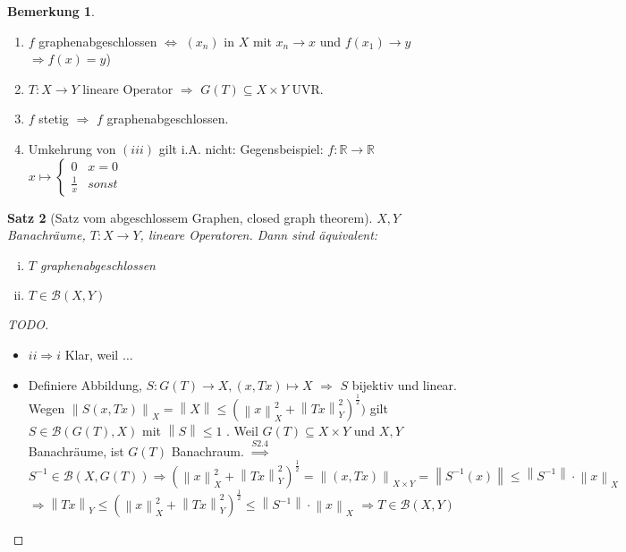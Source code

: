 \documentclass[ngerman]{report}
\theoremstyle{plain}%
\newtheorem{thm}{Satz}[chapter]
\theoremstyle{definition}%
\theoremstyle{myStyle}
\newtheorem{bem}[thm]{Bemerkung}
\newcommand{\R}{\mathbb{R}}
\newcommand{\B}{\mathcal{B}} %
\newcommand{\BS}[1][X,Y]{\mathcal{B}(#1)} %
\newcommand{\norm}[1]{\left \|#1\right\| }
\newcommand{\df}[1][]{%
	\overset{#1}{\Rightarrow}
}
\newcommand{\aq}{\Leftrightarrow} %
\newcommand{\inv}[1]{#1^{-1}}
\newcommand{\qmarks}[1]{#1}
\begin{document}
	\begin{bem}
		\begin{enumerate}
			\item $f$ graphenabgeschlossen $\aq$ $(x_n)$ in $X$ mit $x_n \to x$ und $f(x_1) \to y$ 
			$\df f(x) = y$)
			\item $T: X\to Y$ lineare Operator $\df$ $G(T) \subseteq X\times Y$ UVR.
			\item $f$ stetig $\df$ $f$ graphenabgeschlossen.
			\item Umkehrung von $(iii)$ gilt i.A. nicht: Gegensbeispiel: $f: \R \to \R$ 
				$x\mapsto \begin{cases} 0& x=0\\ \frac{1}{x} & sonst \end{cases}$
		\end{enumerate}
	\end{bem}

	\begin{thm}[Satz vom abgeschlossem Graphen, closed graph theorem]
		$X,Y$ Banachräume, $T: X\to Y$, lineare Operatoren. Dann sind äquivalent:
			\begin{enumerate}[(i)]
				\item $T$ graphenabgeschlossen
				\item $T\in \BS$
			\end{enumerate}
	\end{thm}

	\begin{proof}[TODO]
		\begin{itemize}
			\item \qmarks{$ii\df i$} Klar, weil $\dots$ 
			\item Definiere Abbildung, $S: G(T) \to X, (x,Tx) \mapsto X$
			$\df$ $S$ bijektiv und linear. Wegen 
				$\norm{S(x,Tx)}_X = \norm{X} \leq (\norm{x}_X^2 + \norm{Tx}_Y^2)^{\frac{1}{2}})$
				gilt $S\in \B(G(T),X)$ mit $\norm{S} \leq 1$ .
				Weil $G(T) \subseteq X\times Y$ und $X,Y$ Banachräume, ist $G(T)$ Banachraum.
				$\df[S2.4]$ $\inv{S} \in \B(X, G(T)) \df (\norm{x}_X^2 + \norm{Tx}_Y^2)^{\frac{1}{2}} = \norm{(x,Tx)}_{X\times Y} = \norm{\inv{S}(x)} \leq \norm{\inv{S}} \cdot \norm{x}_X$
				$\df \norm{Tx}_Y \leq (\norm{x}_X^2 + \norm{Tx}_Y^2)^{\frac{1}{2}} \leq \norm{\inv{S}}\cdot\norm{x}_X$
				$\df T\in\BS$
		\end{itemize}
	\end{proof}
\end{document}
